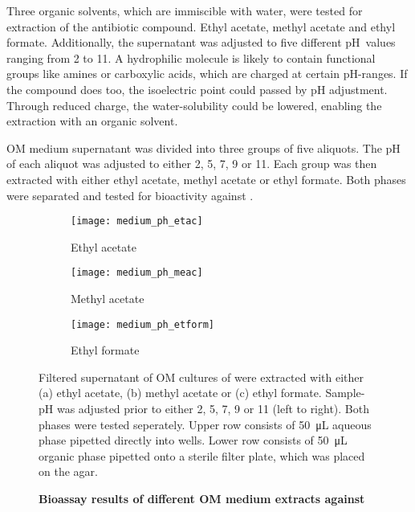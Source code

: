 	Three organic solvents, which are immiscible with water, were tested for extraction of the antibiotic compound. Ethyl acetate, methyl acetate and ethyl formate. Additionally, the supernatant was adjusted to five different pH~values ranging from 2 to 11. A hydrophilic molecule is likely to contain functional groups like amines or carboxylic acids, which are charged at certain pH-ranges. If the compound does too, the isoelectric point could passed by pH adjustment. Through reduced charge, the water-solubility could be lowered, enabling the extraction with an organic solvent.
	
	OM medium supernatant was divided into three groups of five aliquots. The pH of each aliquot was adjusted to either 2, 5, 7, 9 or 11. Each group was then extracted with either ethyl acetate, methyl acetate or ethyl formate. Both phases were separated and tested for bioactivity against \coli. 
	
	\begin{figure}[htbp]
		\centering
		\begin{subfigure}{\textwidth}
			\texttt{[image: medium\_ph\_etac]}
			\caption{Ethyl acetate}
		\end{subfigure}
		\begin{subfigure}{\textwidth}
			\texttt{[image: medium\_ph\_meac]}
			\caption{Methyl acetate}
		\end{subfigure}
		\begin{subfigure}{\textwidth}
			\texttt{[image: medium\_ph\_etform]}
			\caption{Ethyl formate}
		\end{subfigure}
		\caption[Bioassay results of different OM medium extracts against \coli]{\textbf{Bioassay results of different OM medium extracts against \coli}}
		\label{fig:results_extraction_bioassay} Filtered supernatant of OM cultures of \tue were extracted with either (a) ethyl acetate, (b) methyl acetate or (c) ethyl formate. Sample-pH was adjusted prior to either 2, 5, 7, 9 or 11 (left to right). Both phases were tested seperately. Upper row consists of \SI{50}{\micro\liter} aqueous phase pipetted directly into wells. Lower row consists of \SI{50}{\micro\liter} organic phase pipetted onto a sterile filter plate, which was placed on the agar.
	\end{figure}
	
	
